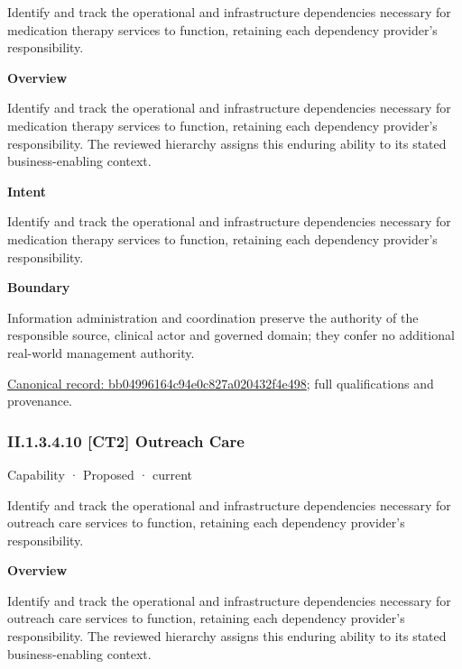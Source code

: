 Identify and track the operational and infrastructure dependencies necessary for medication therapy services to function, retaining each dependency provider's responsibility.



\textbf{Overview}



Identify and track the operational and infrastructure dependencies necessary for medication therapy services to function, retaining each dependency provider's responsibility. The reviewed hierarchy assigns this enduring ability to its stated business-enabling context.



\textbf{Intent}



Identify and track the operational and infrastructure dependencies necessary for medication therapy services to function, retaining each dependency provider's responsibility.



\textbf{Boundary}



Information administration and coordination preserve the authority of the responsible source, clinical actor and governed domain; they confer no additional real-world management authority.


{\footnotesize \href{../../../../continuum/strategy/capability/bb04996164c94e0c827a020432f4e498.md}{Canonical record: bb04996164c94e0c827a020432f4e498}; full qualifications and provenance.}\par
\subsubsection*{II.1.3.4.10 [CT2] Outreach Care}
\label{navigation:II.1.3.4.10}

\label{element:b9ddbe2dd6a7485ba9cd3482215ea09e}
{\small Capability · Proposed · current}\par

Identify and track the operational and infrastructure dependencies necessary for outreach care services to function, retaining each dependency provider's responsibility.



\textbf{Overview}



Identify and track the operational and infrastructure dependencies necessary for outreach care services to function, retaining each dependency provider's responsibility. The reviewed hierarchy assigns this enduring ability to its stated business-enabling context.



